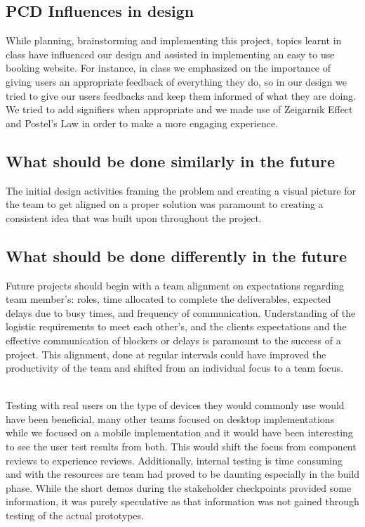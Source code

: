 \documentclass[english,course]{lecture}
\begin{document}
\subsection{PCD Influences in design}
While planning, brainstorming and implementing this project, topics learnt in class have influenced our design and assisted in implementing an easy to use booking website. For instance, in class we emphasized on the importance of giving users an appropriate feedback of everything they do, so in our design we tried to give our users feedbacks and keep them informed of what they are doing. We tried to add signifiers when appropriate and we made use of Zeigarnik Effect and Postel's Law in order to make a more engaging experience.

\subsection{What should be done similarly in the future}
The initial design activities framing the problem and creating a visual picture for the team to get aligned on a proper solution was paramount to creating a consistent idea that was built upon throughout the project.

\subsection{What should be done differently in the future}
Future projects should begin with a team alignment on expectations regarding team member's: roles, time allocated to complete the deliverables, expected delays due to busy times, and frequency of communication. Understanding of the logistic requirements to meet each other's, and the clients expectations and the effective communication of blockers or delays is paramount to the success of a project. This alignment, done at regular intervals could have improved the productivity of the team and shifted from an individual focus to a team focus.

\\Testing with real users on the type of devices they would commonly use would have been beneficial, many other teams focused on desktop implementations while we focused on a mobile implementation and it would have been interesting to see the user test results from both. This would shift the focus from component reviews to experience reviews. Additionally, internal testing is time consuming and with the resources are team had proved to be daunting especially in the build phase. While the short demos during the stakeholder checkpoints provided some information, it was purely speculative as that information was not gained through testing of the actual prototypes.
\end{document}
